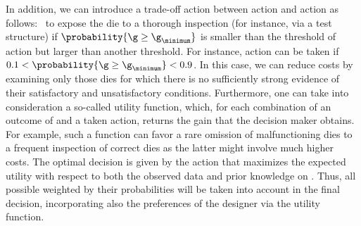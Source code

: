 In addition, we can introduce a trade-off action between action \one and action
\two as follows: \three~to expose the die to a thorough inspection (for
instance, via a test structure) if $\probability{\g \geq \g_\minimum}$ is
smaller than the threshold of action \one but larger than another threshold. For
instance, action \three can be taken if $0.1 < \probability{\g \geq \g_\minimum}
< 0.9$. In this case, we can reduce costs by examining only those dies for which
there is no sufficiently strong evidence of their satisfactory and
unsatisfactory conditions. Furthermore, one can take into consideration a
so-called utility function, which, for each combination of an outcome of \g and
a taken action, returns the gain that the decision maker obtains. For example,
such a function can favor a rare omission of malfunctioning dies to a frequent
inspection of correct dies as the latter might involve much higher costs. The
optimal decision is given by the action that maximizes the expected utility with
respect to both the observed data and prior knowledge on \g. Thus, all possible
\g weighted by their probabilities will be taken into account in the final
decision, incorporating also the preferences of the designer via the utility
function.
